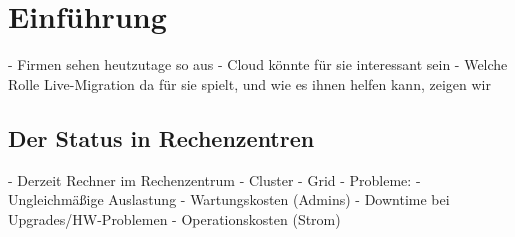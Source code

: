 \section{Einführung}
\label{sec:einfuehrung}



- Firmen sehen heutzutage so aus
- Cloud könnte für sie interessant sein
- Welche Rolle Live-Migration da für sie spielt, und wie es ihnen
helfen kann, zeigen wir

\subsection{Der Status in Rechenzentren}
- Derzeit Rechner im Rechenzentrum
- Cluster
- Grid
- Probleme:
  - Ungleichmäßige Auslastung
  - Wartungskosten (Admins)
  - Downtime bei Upgrades/HW-Problemen
  - Operationskosten (Strom)

